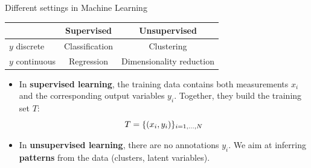 \documentclass[xcolor=pdftex,dvipsnames,table]{beamer}
\begin{document}
\begin{frame}{Different settings in Machine Learning}
	\begin{table}
	\begin{tabular}{|l || c | c | }
		\hline
 		& Supervised & Unsupervised \\
		\hline \hline
		$y$ discrete & Classification & Clustering \\
		$y$ continuous & Regression & Dimensionality reduction\\
		\hline
	\end{tabular}
	\end{table}
\begin{itemize}
	\item In \textbf{supervised learning}, the training data contains both measurements $x_i$ and the corresponding output variables $y_i$. Together, they build the training set $T$:
	\begin{equation}
	T = \{(x_i, y_i)\}_{i=1, \ldots, N}
	\end{equation}
	\item In \textbf{unsupervised learning}, there are no annotations $y_i$. We aim at inferring \textbf{patterns} from the data (clusters, latent variables).
\end{itemize}
\end{frame}
\end{document}
